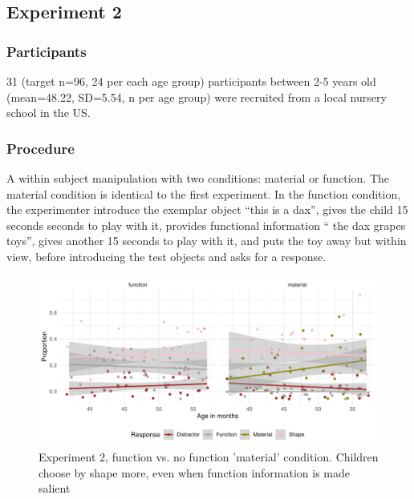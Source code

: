 \documentclass[10pt, letterpaper]{article}
\newenvironment{CodeChunk}{}{}
\begin{document}
\hypertarget{experiment-2}{%
\subsection{Experiment 2}\label{experiment-2}}

\hypertarget{participants-1}{%
\subsubsection{Participants}\label{participants-1}}

31 (target n=96, 24 per each age group) participants between 2-5 years
old (mean=48.22, SD=5.54, n per age group) were recruited from a local
nursery school in the US.

\hypertarget{procedure-1}{%
\subsubsection{Procedure}\label{procedure-1}}

A within subject manipulation with two conditions: material or function.
The material condition is identical to the first experiment. In the
function condition, the experimenter introduce the exemplar object
``this is a dax'', gives the child 15 seconds seconds to play with it,
provides functional information `` the dax grapes toys'', gives another
15 seconds to play with it, and puts the toy away but within view,
before introducing the test objects and asks for a response.

\begin{CodeChunk}
\begin{figure}[!h]
\includegraphics[width=1\linewidth]{figs/jitter_function-1} \caption[Experiment 2, function vs]{Experiment 2, function vs. no function 'material'  condition. Children choose by shape more, even when function information is made salient}\label{fig:jitter_function}
\end{figure}
\end{CodeChunk}
\end{document}
